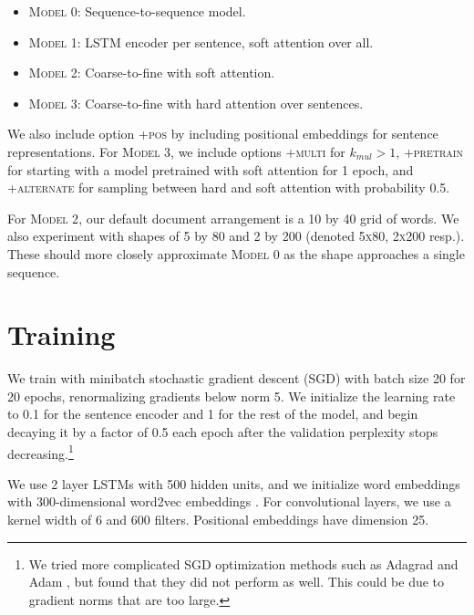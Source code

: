 \documentclass[12pt]{report}
\begin{document}
\begin{itemize}
\item \textsc{Model 0}: Sequence-to-sequence model.
\item \textsc{Model 1}: LSTM encoder per sentence, soft attention over all.
\item \textsc{Model 2}: Coarse-to-fine with soft attention.
\item \textsc{Model 3}: Coarse-to-fine with hard attention over sentences.
\end{itemize}

We also include option \textsc{+pos} by including positional embeddings for sentence representations. For \textsc{Model 3}, we include options \textsc{+multi} for $k_{mul} > 1$, \textsc{+pretrain} for starting with a model pretrained with soft attention for 1 epoch, and \textsc{+alternate} for sampling between hard and soft attention with probability 0.5.

For \textsc{Model 2}, our default document arrangement is a 10 by 40 grid of words. We also experiment with shapes of 5 by 80 and 2 by 200 (denoted \textsc{5x80}, \textsc{2x200} resp.). These should more closely approximate \textsc{Model 0} as the shape approaches a single sequence.


\section{Training}

We train with minibatch stochastic gradient descent (SGD) with batch size 20 for 20 epochs, renormalizing gradients below norm 5. We initialize the learning rate to 0.1 for the sentence encoder and 1 for the rest of the model, and begin decaying it by a factor of 0.5 each epoch after the validation perplexity stops decreasing.\footnote{We tried more complicated SGD optimization methods such as Adagrad \citep{Duchi2011} and Adam \citep{Kingma2015}, but found that they did not perform as well. This could be due to gradient norms that are too large.}

We use 2 layer LSTMs with 500 hidden units, and we initialize word embeddings with 300-dimensional word2vec embeddings \citep{mikolov2013word2vec}. For convolutional layers, we use a kernel width of 6 and 600 filters. Positional embeddings have dimension 25.

\end{document}
